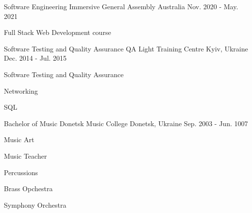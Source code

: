 

\begin{cventries}

  \cventry
    {Software Engineering Immersive} %
    {General Assembly} %
    {Australia} %
    {Nov. 2020 - May. 2021} %
    {
      \begin{cvitems} %
        \item {Full Stack Web Development course}
      \end{cvitems}
    }


  \cventry
    {Software Testing and Quality Assurance} %
    {QA Light Training Centre} %
    {Kyiv, Ukraine} %
    {Dec. 2014 - Jul. 2015} %
    {
      \begin{cvitems} %
        \item {Software Testing and Quality Assurance}
        \item {Networking}
        \item {SQL}
      \end{cvitems}
    }
  \cventry
    {Bachelor of Music} %
    {Donetsk Music College} %
    {Donetsk, Ukraine} %
    {Sep. 2003 - Jun. 1007} %
    {
      \begin{cvitems} %
        \item {Music Art}
        \item {Music Teacher}
        \item {Percussions}
        \item {Brass Opchestra}
        \item {Symphony Orchestra}
      \end{cvitems}
    }
\end{cventries}
